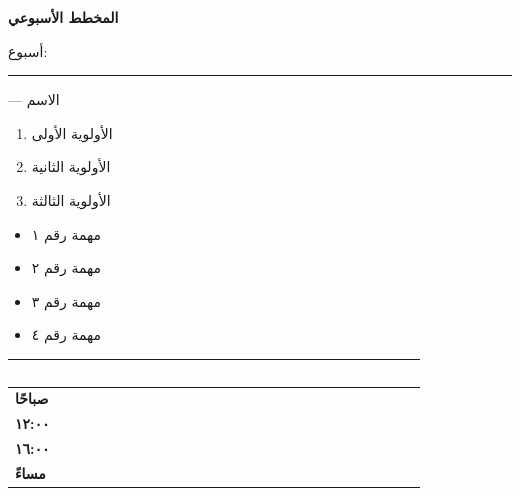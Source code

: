 \documentclass[11pt,a4paper]{article}
\begin{document}
\color{planink}

\begin{center}
{\fontsize{26pt}{32pt}\selectfont\bfseries\color{planaccent}
المخطط الأسبوعي\par}
\vspace{0.1cm}
{\large\color{planhead} أسبوع: \rule{4cm}{0.4pt} — الاسم\par}
\end{center}

\vspace{0.3cm}

\noindent
\begin{minipage}[t]{0.48\linewidth}
\begin{prioritiesbox}
\begin{enumerate}[label=\textarabic{\arabic*.},leftmargin=1.4em,itemsep=1pt,topsep=0pt]
  \item الأولوية الأولى
  \item الأولوية الثانية
  \item الأولوية الثالثة
\end{enumerate}
\end{prioritiesbox}
\end{minipage}\hfill
\begin{minipage}[t]{0.48\linewidth}
\begin{tcolorbox}[colback=white,colframe=planaccent,boxrule=0.6pt,arc=2pt,
  fonttitle=\bfseries\color{white},coltitle=white,title=قائمة المهام (To-Do),
  left=6pt,right=6pt,top=4pt,bottom=4pt]
\begin{itemize}[label=$\square$,leftmargin=1.4em,itemsep=1pt,topsep=0pt]
  \item مهمة رقم ١
  \item مهمة رقم ٢
  \item مهمة رقم ٣
  \item مهمة رقم ٤
\end{itemize}
\end{tcolorbox}
\end{minipage}

\vspace{0.25cm}

\noindent
{\renewcommand{\arraystretch}{1.1}
\begin{tabularx}{\linewidth}{|T|S|S|S|S|S|S|S|}
\hline
{}
\textcolor{white}{\textbf{الوقت}} &
\textcolor{white}{\textbf{السبت}} &
\textcolor{white}{\textbf{الأحد}} &
\textcolor{white}{\textbf{الاثنين}} &
\textcolor{white}{\textbf{الثلاثاء}} &
\textcolor{white}{\textbf{الأربعاء}} &
\textcolor{white}{\textbf{الخميس}} &
\textcolor{white}{\textbf{الجمعة}} \\
\hline
\textbf{صباحًا} & & & & & & & \\
\hline
\textbf{١٢:٠٠} & & & & & & & \\
\hline
\textbf{١٦:٠٠} & & & & & & & \\
\hline
\textbf{مساءً} & & & & & & & \\
\hline
\end{tabularx}}
\end{document}
